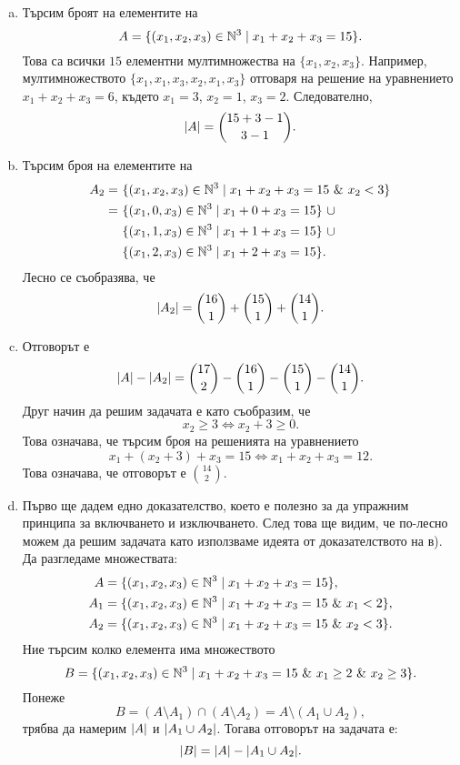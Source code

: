 \begin{solution}
  \begin{enumerate}[a)]
  \item
    Търсим броят на елементите на 
    \[A = \{(x_1,x_2,x_3) \in \mathbb{N}^3\mid x_1 + x_2 + x_3 = 15\}.\]
    Това са всички $15$ елементни мултимножества на  $\{x_1,x_2,x_3\}$.
    Например, мултимножеството $\{x_1,x_1,x_3,x_2,x_1,x_3\}$ отговаря на решение на уравнението $x_1 + x_2 + x_3 = 6$,
    където $x_1 = 3$, $x_2 = 1$, $x_3 = 2$.
    Следователно,
    \[\lvert{A}\rvert = \binom{15 + 3 - 1}{3-1}.\]
  \item
    Търсим броя на елементите на 
    \begin{align*}
      A_2 =\ &\{(x_1,x_2,x_3) \in \Nat^3\mid x_1 + x_2 + x_3 = 15\ \&\ x_2 < 3\}\\
      =\ & \{(x_1,0,x_3) \in \Nat^3\mid x_1 + 0 + x_3 = 15\}\ \cup \\ 
      & \{(x_1,1,x_3) \in \Nat^3\mid x_1 + 1 + x_3 = 15\}\ \cup \\ 
      & \{(x_1,2,x_3) \in \Nat^3\mid x_1 + 2 + x_3 = 15\}.
    \end{align*}
    Лесно се съобразява, че
    \[\lvert{A_2}\rvert = \binom{16}{1} + \binom{15}{1} + \binom{14}{1}.\]
  \item
    Отговорът е
    \[\lvert{A}\rvert - \lvert{A_2}\rvert = \binom{17}{2} - \binom{16}{1} - \binom{15}{1} - \binom{14}{1}.\]
    Друг начин да решим задачата е като съобразим, че 
    \[x_2 \geq 3 \iff x_2 + 3 \geq 0.\]
    Това означава, че търсим броя на решенията на уравнението
    \[x_1 + (x_2 + 3) + x_3 = 15 \iff x_1 + x_2 + x_3 = 12.\]
    Това означава, че отговорът е $\binom{14}{2}$.
  \item
    Първо ще дадем едно доказателство, което е полезно за да упражним принципа за включването и изключването.
    След това ще видим, че по-лесно можем да решим задачата като използваме идеята от доказателството на в).
    Да разгледаме множествата:
    \begin{align*}
      A & = \{(x_1,x_2,x_3) \in \Nat^3\mid x_1 + x_2 + x_3 = 15\},\\
      A_1 & = \{(x_1,x_2,x_3) \in \Nat^3\mid x_1 + x_2 + x_3 = 15\ \&\ x_1 < 2\},\\
      A_2 & = \{(x_1,x_2,x_3) \in \Nat^3\mid x_1 + x_2 + x_3 = 15\ \&\ x_2 < 3\}.
    \end{align*}
    Ние търсим колко елемента има множеството 
    \[B = \{(x_1,x_2,x_3) \in \mathbb{N}^3\mid x_1 + x_2 + x_3 = 15\ \&\ x_1 \geq 2\ \&\ x_2 \geq 3\}.\]
    Понеже \[B = (A\setminus A_1) \cap (A\setminus A_2) = A \setminus (A_1 \cup A_2),\]
    трябва да намерим $\lvert{A}\rvert$ и $\lvert{A_1 \cup A_2}\rvert$. Тогава отговорът на задачата е:
    \[\lvert{B}\rvert = \lvert{A}\rvert - \lvert{A_1 \cup A_2}\rvert.\]


\end{enumerate}
\end{solution}
